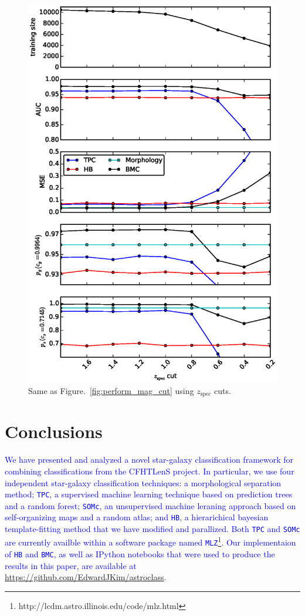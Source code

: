 \documentclass[useAMS,usenatbib]{mn2e}
\begin{document}
\begin{figure}
\begin{minipage}[t]{0.49\linewidth}
    \includegraphics[width=\textwidth]{figures/perform_z_cut.eps}
    \caption{Same as Figure.~\ref{fig:perform_mag_cut} using
      $z_{\text{spec}}$ cuts.}
    \label{fig:perform_z_cut}
  \end{minipage}
\end{figure}
\section{Conclusions}
  \label{section:conclusions}

\textcolor{blue}{We
have presented and analyzed a novel star-galaxy classification framework
for combining classifications from the CFHTLenS project.
In particular, we use four independent star-galaxy classification techniques:
a morphological separation method;
\texttt{TPC}, a supervised machine learning technique
based on prediction trees and a random forest;
\texttt{SOMc}, an unsupervised machine leraning approach
based on self-organizing maps and a random atlas;
and \texttt{HB}, a hierarichical bayesian template-fitting method
that we have modified and parallized.
Both \texttt{TPC} and \texttt{SOMc} are currently availble within
a software package named
\texttt{MLZ}\footnote{http://lcdm.astro.illinois.edu/code/mlz.html}.
Our implementaion of \texttt{HB} and \texttt{BMC},
as well as IPython notebooks that were used to
produce the results in this paper,
are available at \url{https://github.com/EdwardJKim/astroclass}.  }
\end{document}
